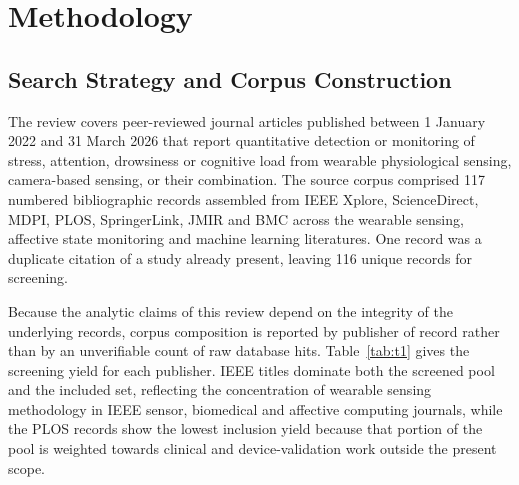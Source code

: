 \documentclass[11pt,a4paper]{article}
\begin{document}
\section{Methodology}

\subsection{Search Strategy and Corpus Construction}
The review covers peer-reviewed journal articles published between 1 January 2022 and
31 March 2026 that report quantitative detection or monitoring of stress, attention,
drowsiness or cognitive load from wearable physiological sensing, camera-based sensing, or
their combination. The source corpus comprised 117 numbered bibliographic records assembled
from IEEE Xplore, ScienceDirect, MDPI, PLOS, SpringerLink, JMIR and BMC across the wearable
sensing, affective state monitoring and machine learning literatures. One record was a
duplicate citation of a study already present, leaving 116 unique records for screening.

Because the analytic claims of this review depend on the integrity of the underlying records,
corpus composition is reported by publisher of record rather than by an unverifiable count of
raw database hits. Table~\ref{tab:t1} gives the screening yield for each publisher. IEEE
titles dominate both the screened pool and the included set, reflecting the concentration of
wearable sensing methodology in IEEE sensor, biomedical and affective computing journals,
while the PLOS records show the lowest inclusion yield because that portion of the pool is
weighted towards clinical and device-validation work outside the present scope.
\end{document}
